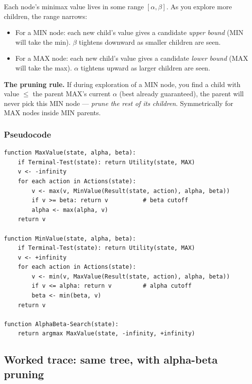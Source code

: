 \documentclass[11pt, a4paper]{article}
\begin{document}
Each node's minimax value lives in some range $[\alpha, \beta]$. As you explore more children, the range narrows:

\begin{itemize}
  \item For a MIN node: each new child's value gives a candidate \emph{upper bound} (MIN will take the min). $\beta$ tightens downward as smaller children are seen.
  \item For a MAX node: each new child's value gives a candidate \emph{lower bound} (MAX will take the max). $\alpha$ tightens upward as larger children are seen.
\end{itemize}

\textbf{The pruning rule.} If during exploration of a MIN node, you find a child with value $\le$ the parent MAX's current $\alpha$ (best already guaranteed), the parent will never pick this MIN node — \emph{prune the rest of its children}. Symmetrically for MAX nodes inside MIN parents.

\subsubsection*{Pseudocode}

\begin{exbox}
\begin{verbatim}
function MaxValue(state, alpha, beta):
    if Terminal-Test(state): return Utility(state, MAX)
    v <- -infinity
    for each action in Actions(state):
        v <- max(v, MinValue(Result(state, action), alpha, beta))
        if v >= beta: return v          # beta cutoff
        alpha <- max(alpha, v)
    return v

function MinValue(state, alpha, beta):
    if Terminal-Test(state): return Utility(state, MAX)
    v <- +infinity
    for each action in Actions(state):
        v <- min(v, MaxValue(Result(state, action), alpha, beta))
        if v <= alpha: return v         # alpha cutoff
        beta <- min(beta, v)
    return v

function AlphaBeta-Search(state):
    return argmax MaxValue(state, -infinity, +infinity)
\end{verbatim}
\end{exbox}

\subsection{Worked trace: same tree, with alpha-beta pruning}
\end{document}
